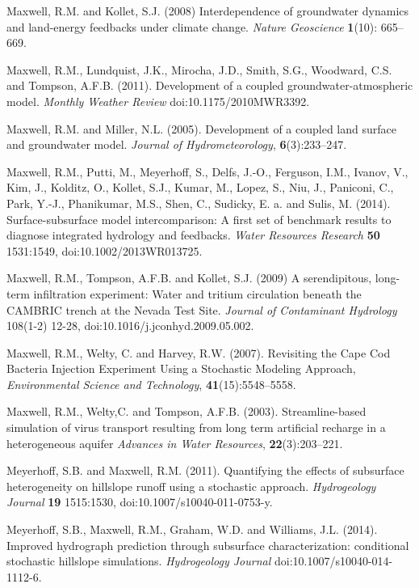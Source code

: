 \begin{thebibliography}{999}
Maxwell, R.M. and Kollet, S.J. (2008) Interdependence of groundwater dynamics and land-energy feedbacks under climate change. {\em Nature Geoscience} {\bf 1}(10): 665--669.

Maxwell, R.M., Lundquist, J.K., Mirocha, J.D., Smith, S.G., Woodward, C.S. and Tompson, A.F.B. (2011). Development of a coupled groundwater-atmospheric model. {\em Monthly Weather Review} doi:10.1175/2010MWR3392.

Maxwell, R.M. and Miller, N.L. (2005). Development of a coupled land surface and groundwater model.  {\em Journal of Hydrometeorology}, {\bf 6}(3):233--247.

Maxwell, R.M., Putti, M., Meyerhoff, S., Delfs, J.-O., Ferguson, I.M., Ivanov, V., Kim, J., Kolditz, O., Kollet, S.J., Kumar, M., Lopez, S., Niu, J., Paniconi, C., Park, Y.-J., Phanikumar, M.S., Shen, C., Sudicky, E. a. and Sulis, M. (2014). Surface-subsurface model intercomparison: A first set of benchmark results to diagnose integrated hydrology and feedbacks. {\em Water Resources Research} {\bf 50} 1531:1549, doi:10.1002/2013WR013725.

Maxwell, R.M., Tompson, A.F.B. and Kollet, S.J. (2009) A serendipitous, long-term infiltration experiment: Water and tritium circulation beneath the CAMBRIC trench at the Nevada Test Site. {\em Journal of Contaminant Hydrology} 108(1-2) 12-28, doi:10.1016/j.jconhyd.2009.05.002.

Maxwell, R.M., Welty, C. and Harvey, R.W. (2007). Revisiting the Cape Cod Bacteria Injection Experiment Using a Stochastic Modeling Approach, {\em Environmental Science and Technology}, { \bf 41}(15):5548--5558.

 Maxwell, R.M., Welty,C. and Tompson, A.F.B. (2003).
Streamline-based simulation of virus transport resulting from long term
artificial recharge in a heterogeneous aquifer {\em Advances in Water
Resources}, {\bf 22}(3):203--221.

Meyerhoff, S.B. and Maxwell, R.M. (2011). Quantifying the effects of subsurface heterogeneity on hillslope runoff using a stochastic approach. {\em Hydrogeology Journal} {\bf 19} 1515:1530, doi:10.1007/s10040-011-0753-y.

Meyerhoff, S.B., Maxwell, R.M., Graham, W.D. and Williams, J.L. (2014). Improved hydrograph prediction through subsurface characterization: conditional stochastic hillslope simulations. {\em Hydrogeology Journal} doi:10.1007/s10040-014-1112-6.


\end{thebibliography}
